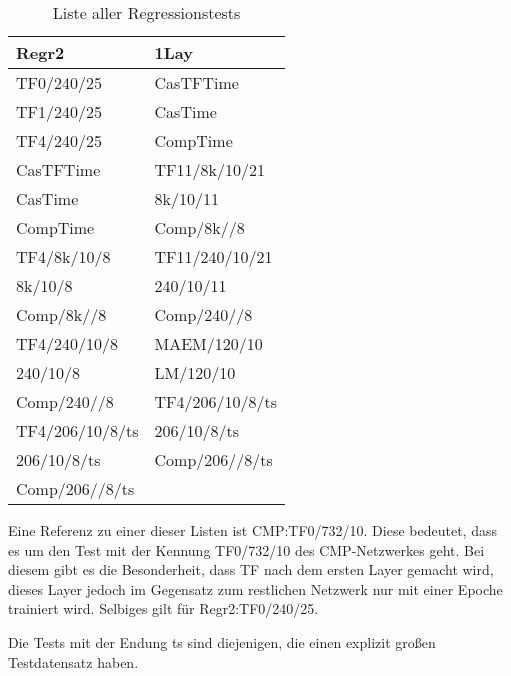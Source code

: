 \begin{table}[!ht]
    \centering
    \begin{tabular}{l|l}
        \textbf{Regr2} & \textbf{1Lay} \\
        \hline
        TF0/240/25 & CasTFTime \\
        TF1/240/25 & CasTime \\
        TF4/240/25 & CompTime \\
        CasTFTime & TF11/8k/10/21 \\
        CasTime & 8k/10/11 \\
        CompTime & Comp/8k//8 \\
        TF4/8k/10/8 & TF11/240/10/21 \\
        8k/10/8 & 240/10/11 \\
        Comp/8k//8 & Comp/240//8 \\
        TF4/240/10/8 & MAEM/120/10 \\
        240/10/8 & LM/120/10 \\
        Comp/240//8 & TF4/206/10/8/ts \\
        TF4/206/10/8/ts & 206/10/8/ts \\
        206/10/8/ts & Comp/206//8/ts \\
        Comp/206//8/ts &
    \end{tabular}
    \caption{\label{tab:regrtests} Liste aller Regressionstests}
\end{table}

Eine Referenz zu einer dieser Listen ist CMP:TF0/732/10. Diese bedeutet, dass es um den Test mit der Kennung TF0/732/10 des CMP-Netzwerkes geht. 
Bei diesem gibt es die Besonderheit, dass TF nach dem ersten Layer gemacht wird, dieses Layer jedoch im 
Gegensatz zum restlichen Netzwerk nur mit einer Epoche trainiert wird.
Selbiges gilt für Regr2:TF0/240/25.

Die Tests mit der Endung ts sind diejenigen, die einen explizit großen Testdatensatz haben. 
